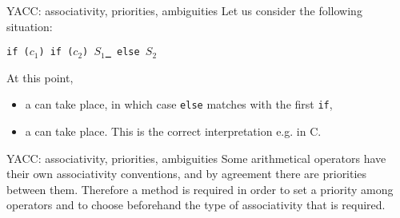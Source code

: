 \begin{frame}[fragile]{YACC: associativity, priorities, ambiguities}
Let us consider the following situation:


\vspace{20pt}

{\tt if ($c_1$) if ($c_2$) $S_1${\bf \_} else $S_2$}


\vspace{20pt}

At this point,


\vspace{20pt}

\begin{itemize}
\item  a \reduce{} can take place, in which case
{\tt else} matches with the first {\tt if},
\item  a \shift{} can take place. This is the correct interpretation
e.g. in C.
\end{itemize}




\end{frame}
\begin{frame}[fragile]{YACC: associativity, priorities, ambiguities}
Some arithmetical operators have their own associativity conventions,
and by agreement there are priorities between them.
Therefore a method is required in order to set a priority
among operators and to choose beforehand the type
of associativity that is required.


\vspace{20pt}





\end{frame}
